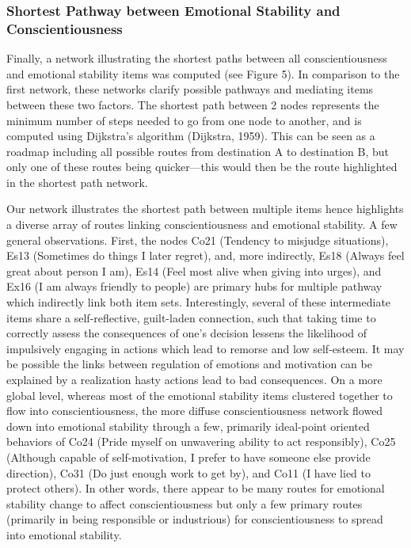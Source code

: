 \documentclass[english,man]{apa6}
\theoremstyle{definition}
\theoremstyle{definition}
\theoremstyle{remark}
\begin{document}
\subsubsection{Shortest Pathway between Emotional Stability and
Conscientiousness}\label{shortest-pathway-between-emotional-stability-and-conscientiousness}

Finally, a network illustrating the shortest paths between all
conscientiousness and emotional stability items was computed (see Figure
5). In comparison to the first network, these networks clarify possible
pathways and mediating items between these two factors. The shortest
path between 2 nodes represents the minimum number of steps needed to go
from one node to another, and is computed using Dijkstra's algorithm
(Dijkstra, 1959). This can be seen as a roadmap including all possible
routes from destination A to destination B, but only one of these routes
being quicker---this would then be the route highlighted in the shortest
path network.

Our network illustrates the shortest path between multiple items hence
highlights a diverse array of routes linking conscientiousness and
emotional stability. A few general observations. First, the nodes Co21
(Tendency to misjudge situations), Es13 (Sometimes do things I later
regret), and, more indirectly, Es18 (Always feel great about person I
am), Es14 (Feel most alive when giving into urges), and Ex16 (I am
always friendly to people) are primary hubs for multiple pathway which
indirectly link both item sets. Interestingly, several of these
intermediate items share a self-reflective, guilt-laden connection, such
that taking time to correctly assess the consequences of one's decision
lessens the likelihood of impulsively engaging in actions which lead to
remorse and low self-esteem. It may be possible the links between
regulation of emotions and motivation can be explained by a realization
hasty actions lead to bad consequences. On a more global level, whereas
most of the emotional stability items clustered together to flow into
conscientiousness, the more diffuse conscientiousness network flowed
down into emotional stability through a few, primarily ideal-point
oriented behaviors of Co24 (Pride myself on unwavering ability to act
responsibly), Co25 (Although capable of self-motivation, I prefer to
have someone else provide direction), Co31 (Do just enough work to get
by), and Co11 (I have lied to protect others). In other words, there
appear to be many routes for emotional stability change to affect
conscientiousness but only a few primary routes (primarily in being
responsible or industrious) for conscientiousness to spread into
emotional stability.
\end{document}
